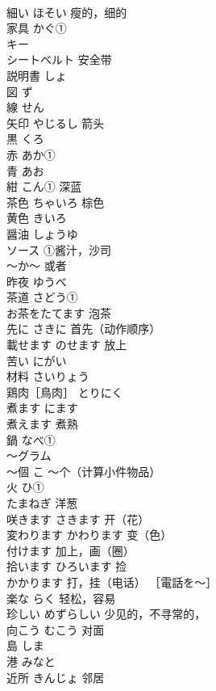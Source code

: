 \documentclass[8pt]{extreport}
\begin{document}
\begin{CJK}{UTF8}{min}
\\	細い	ほそい 瘦的，细的	
\\	家具	かぐ①	
\\	キー	
\\	シートベルト	安全带	
\\	説明書	しょ	
\\	図	ず	
\\	線	せん	
\\	矢印	やじるし 箭头	
\\	黒	くろ 
\\	赤	あか①	
\\	青	あお	
\\	紺	こん① 深蓝	
\\	茶色	ちゃいろ 棕色	
\\	黄色	きいろ	
\\	醤油	しょうゆ	
\\	ソース	①酱汁，沙司	
\\	〜か〜	或者	
\\	昨夜	ゆうべ	
\\	茶道	さどう①	
\\	お茶をたてます	泡茶	
\\	先に	さきに 首先（动作顺序）	
\\	載せます	のせます 放上	
\\	苦い	にがい	
\\	材料	さいりょう	
\\	鶏肉［鳥肉］	とりにく	
\\	煮ます	にます	
\\	煮えます	煮熟	
\\	鍋	なべ①	
\\	～グラム	
\\	〜個	こ ～个（计算小件物品）	
\\	火	ひ①	
\\	たまねぎ	洋葱	
\\	咲きます	さきます 开（花）	
\\	変わります	かわります 变（色）	
\\	付けます	加上，画（圈）	
\\	拾います	ひろいます 捡	
\\	かかります	打，挂（电话） ［電話を〜］	
\\	楽な	らく 轻松，容易	
\\	珍しい	めずらしい 少见的，不寻常的，	
\\	向こう	むこう 对面	
\\	島	しま	
\\	港	みなと	
\\	近所	きんじょ 邻居	

\end{CJK}
\end{document}
